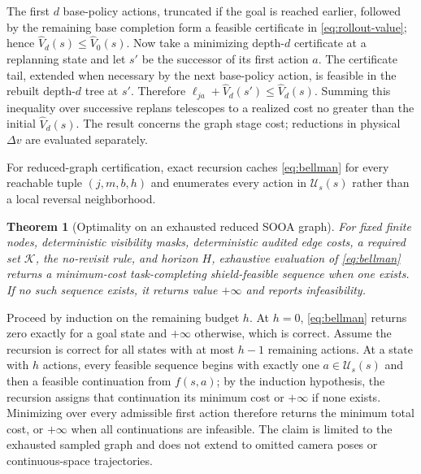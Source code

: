 \documentclass{IEEEtaes}
\newtheorem{theorem}{Theorem}
\theoremstyle{remark}
\theoremstyle{plain}
\begin{document}
\begin{IEEEproof}
The first $d$ base-policy actions, truncated if the goal is reached earlier, followed by the remaining base completion form a feasible certificate in \eqref{eq:rollout-value}; hence $\widehat V_d(s)\le\widehat V_0(s)$. Now take a minimizing depth-$d$ certificate at a replanning state and let $s'$ be the successor of its first action $a$. The certificate tail, extended when necessary by the next base-policy action, is feasible in the rebuilt depth-$d$ tree at $s'$. Therefore $\ell_{ja}+\widehat V_d(s')\le\widehat V_d(s)$. Summing this inequality over successive replans telescopes to a realized cost no greater than the initial $\widehat V_d(s)$. The result concerns the graph stage cost; reductions in physical $\Delta v$ are evaluated separately.
\end{IEEEproof}

For reduced-graph certification, exact recursion caches \eqref{eq:bellman} for every reachable tuple $(j,m,b,h)$ and enumerates every action in $\mathcal U_s(s)$ rather than a local reversal neighborhood.

\begin{theorem}[Optimality on an exhausted reduced SOOA graph]
\label{thm:reduced-optimality}
For fixed finite nodes, deterministic visibility masks, deterministic audited edge costs, a required set $\mathcal K$, the no-revisit rule, and horizon $H$, exhaustive evaluation of \eqref{eq:bellman} returns a minimum-cost task-completing shield-feasible sequence when one exists. If no such sequence exists, it returns value $+\infty$ and reports infeasibility.
\end{theorem}

\begin{IEEEproof}
Proceed by induction on the remaining budget $h$. At $h=0$, \eqref{eq:bellman} returns zero exactly for a goal state and $+\infty$ otherwise, which is correct. Assume the recursion is correct for all states with at most $h-1$ remaining actions. At a state with $h$ actions, every feasible sequence begins with exactly one $a\in\mathcal U_s(s)$ and then a feasible continuation from $f(s,a)$; by the induction hypothesis, the recursion assigns that continuation its minimum cost or $+\infty$ if none exists. Minimizing over every admissible first action therefore returns the minimum total cost, or $+\infty$ when all continuations are infeasible. The claim is limited to the exhausted sampled graph and does not extend to omitted camera poses or continuous-space trajectories.
\end{IEEEproof}
\end{document}
